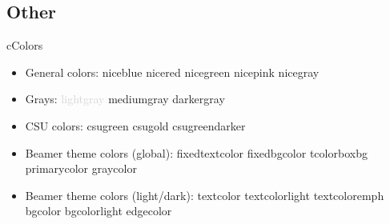 \subsection*{Other}
\begin{myslide}{c}{Colors}

\begin{itemize}

\item General colors:
\textcolor{niceblue}{niceblue}
\textcolor{nicered}{nicered}
\textcolor{nicegreen}{nicegreen}
\textcolor{nicepink}{nicepink}
\textcolor{nicegray}{nicegray}

\item Grays:
\textcolor{lightgray}{lightgray}
\textcolor{mediumgray}{mediumgray}
\textcolor{darkergray}{darkergray}

\item CSU colors:
\textcolor{csugreen}{csugreen}
\textcolor{csugold}{csugold}
\textcolor{csugreendarker}{csugreendarker}


\item Beamer theme colors (global):
\textcolor{fixedtextcolor}{fixedtextcolor}
\textcolor{fixedbgcolor}{fixedbgcolor}
\textcolor{tcolorboxbg}{tcolorboxbg}
\textcolor{primarycolor}{primarycolor}
\textcolor{graycolor}{graycolor}

\item Beamer theme colors (light/dark):
\textcolor{textcolor}{textcolor}
\textcolor{textcolorlight}{textcolorlight}
\textcolor{textcoloremph}{textcoloremph}
\textcolor{bgcolor}{bgcolor}
\textcolor{bgcolorlight}{bgcolorlight}
\textcolor{edgecolor}{edgecolor}

\end{itemize}

\end{myslide}

